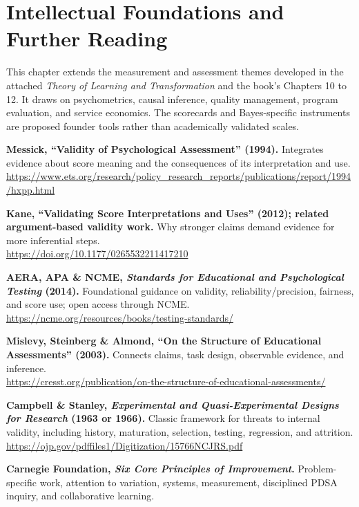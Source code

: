 \section*{Intellectual Foundations and Further Reading}

This chapter extends the measurement and assessment themes developed in the attached \emph{Theory of Learning and Transformation} and the book's Chapters 10 to 12. It draws on psychometrics, causal inference, quality management, program evaluation, and service economics. The scorecards and Bayes-specific instruments are proposed founder tools rather than academically validated scales.

\begin{enumerate}[label={[\textbf{M\arabic*}]}, leftmargin=2em, itemsep=0.6em]
    \item \textbf{Messick, ``Validity of Psychological Assessment'' (1994).} Integrates evidence about score meaning and the consequences of its interpretation and use. \\
    \url{https://www.ets.org/research/policy_research_reports/publications/report/1994/hxpp.html}
    \item \textbf{Kane, ``Validating Score Interpretations and Uses'' (2012); related argument-based validity work.} Why stronger claims demand evidence for more inferential steps. \\
    \url{https://doi.org/10.1177/0265532211417210}
    \item \textbf{AERA, APA \& NCME, \emph{Standards for Educational and Psychological Testing} (2014).} Foundational guidance on validity, reliability/precision, fairness, and score use; open access through NCME. \\
    \url{https://ncme.org/resources/books/testing-standards/}
    \item \textbf{Mislevy, Steinberg \& Almond, ``On the Structure of Educational Assessments'' (2003).} Connects claims, task design, observable evidence, and inference. \\
    \url{https://cresst.org/publication/on-the-structure-of-educational-assessments/}
    \item \textbf{Campbell \& Stanley, \emph{Experimental and Quasi-Experimental Designs for Research} (1963 or 1966).} Classic framework for threats to internal validity, including history, maturation, selection, testing, regression, and attrition. \\
    \url{https://ojp.gov/pdffiles1/Digitization/15766NCJRS.pdf}
    \item \textbf{Carnegie Foundation, \emph{Six Core Principles of Improvement}.} Problem-specific work, attention to variation, systems, measurement, disciplined PDSA inquiry, and collaborative learning. \\

\end{enumerate}
